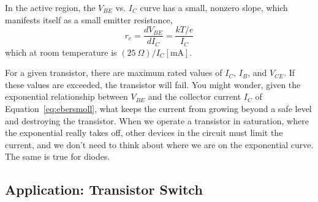 \documentclass[11pt]{article}
\begin{document}
In the active region, the $V_{BE}$ vs. $I_C$ curve has a small,
nonzero slope, which manifests itself as a small emitter resistance,
\begin{equation}
  r_e = \frac{d V_{BE}}{d I_C} = \frac{kT/e}{I_C}
\end{equation}
which at room temperature is $(25~\Omega)/I_C[\mathrm{mA}]$.

For a given transistor, there are maximum rated values of $I_C$,
$I_B$, and $V_{CE}$. If these values are exceeded, the transistor will
fail. You might wonder, given the exponential relationship between
$V_{BE}$ and the collector current $I_C$ of
Equation~\ref{eq:ebersmoll}, what keeps the current from growing
beyond a safe level and destroying the transistor. When we operate a
transistor in saturation, where the exponential really takes off,
other devices in the circuit must limit the current, and we don't need
to think about where we are on the exponential curve. The same is true
for diodes.

\vspace{12 pt}
\noindent
{}

\subsection{Application: Transistor Switch}
\label{sec:transistorswitch}
\end{document}
